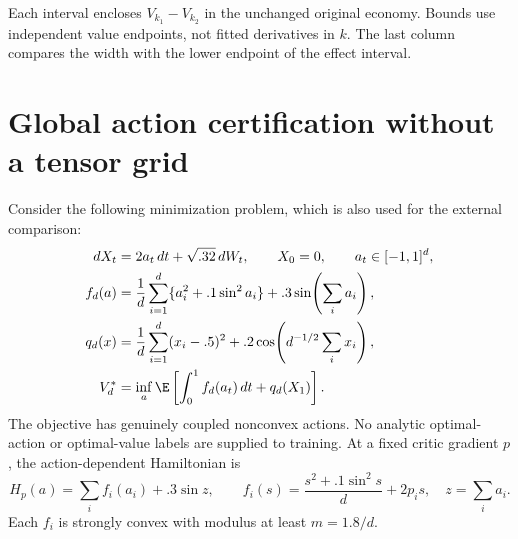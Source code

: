\begin{table}[t]\centering\small
\caption{Accuracy-calibrated optimal welfare losses from higher adjustment costs}\label{r10:tab:cost-effects}

\par\smallskip\footnotesize Each interval encloses $V_{k_1}-V_{k_2}$ in the unchanged original economy. Bounds use independent value endpoints, not fitted derivatives in $k$. The last column compares the width with the lower endpoint of the effect interval.
\end{table}

\section{Global action certification without a tensor grid}\label{r9:action}
Consider the following minimization problem, which is also used for the external comparison:
\begin{align}
 dX_t&=2a_t\,dt+\sqrt{.32}\,dW_t,\qquad X_0=0,
       \qquad a_t\in[-1,1]^d,\\
 f_d(a)&=\frac1d\sum_{i=1}^d\{a_i^2+.1\sin^2a_i\}
                 +.3\sin\!\left(\sum_i a_i\right),\\
 q_d(x)&=\frac1d\sum_{i=1}^d(x_i-.5)^2
                 +.2\cos\!\left(d^{-1/2}\sum_i x_i\right),\label{r9:nonconvex}\\
 V_d^*&=\inf_a\E\left[\int_0^1 f_d(a_t)\,dt+q_d(X_1)\right].\notag
\end{align}
The objective has genuinely coupled nonconvex actions. No analytic optimal-action or optimal-value labels are supplied to training. At a fixed critic gradient $p$, the action-dependent Hamiltonian is
\[
 H_p(a)=\sum_i f_i(a_i)+.3\sin z,\qquad
 f_i(s)=\frac{s^2+.1\sin^2s}{d}+2p_is,\quad z=\sum_i a_i.
\]
Each $f_i$ is strongly convex with modulus at least $m=1.8/d$.

